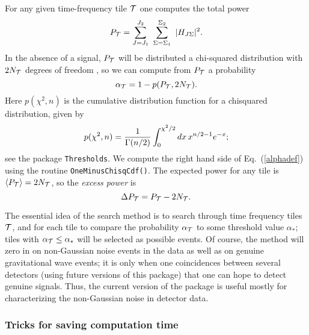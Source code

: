 \documentclass{article}
\begin{document}
For any given time-frequency tile 
${\cal T}$ one computes the total power
\begin{equation}
P_{\cal T} = \sum_{J = J_1}^{J_2} \ \sum_{\Sigma=\Sigma_1}^{\Sigma_2}
\ | H_{J\Sigma} |^2.
\label{power}
\end{equation}
In the absence of a signal, $P_{\cal T}$ will be distributed a
chi-squared distribution with $2 N_{\cal T}$ degrees of freedom
\cite{abcf:2000}, so we can compute from $P_{\cal T}$ a probability
\begin{equation}
\alpha_{\cal T} = 1 - p(P_{\cal T},2 N_{\cal T}).
\label{alphadef}
\end{equation}
Here $p(\chi^2,n)$ is the cumulative distribution function for a
chisquared distribution, given by
\begin{equation}
p(\chi^2,n) = {1 \over \Gamma(n/2)} \int_0^{\chi^2/2} dx \, x^{n/2-1} e^{-x};
\end{equation}
see the package \verb+Thresholds+.  We compute the right hand side of
Eq.\ (\ref{alphadef}) using the routine \verb+OneMinusChisqCdf()+.
The expected power for any tile is $\langle P_{\cal T} \rangle = 2
N_{\cal T}$, so the {\it excess power} is
\begin{equation}
\Delta P_{\cal T} = P_{\cal T} - 2 N_{\cal T}.
\label{ep}
\end{equation}







The essential idea of the search method is to search through time
frequency tiles ${\cal T}$, and for each tile to compare the
probability $\alpha_{\cal T}$ to some threshold value $\alpha_*$;
tiles with $\alpha_{\cal T} \le \alpha_*$ will be selected as possible
events.  Of course, the method will zero in on non-Gaussian noise
events in the data as well as on genuine gravitational wave events; it
is only when one coincidences between several detectors (using future
versions of this package) that one can hope to detect genuine
signals.  Thus, the current version of the package is useful mostly
for characterizing the non-Gaussian noise in detector data.


\subsubsection{Tricks for saving computation time}
\end{document}
